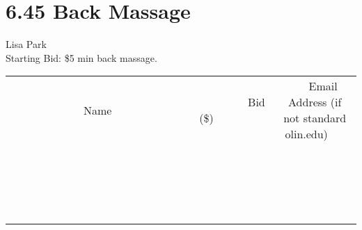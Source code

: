 \documentclass[11pt]{article}
\begin{document}
\section*{6.45 Back Massage}
Lisa Park
\\
Starting Bid: \$5
 min back massage.
\\[3ex]
\begin{tabular}{c c c}
~~~~~~~~~~~~~Name~~~~~~~~~~~~~ & ~~~~~~~~~Bid (\$)~~~~~~~~~  & ~~~Email Address (if not standard olin.edu)~~~\\
 & & \\
\hline
 & & \\
\hline
 & & \\
\hline
 & & \\
\hline
 & & \\
\hline
 & & \\
\hline
 & & \\
\hline
 & & \\
\hline
 & & \\
\hline
 & & \\
\hline
 & & \\
\hline
 & & \\
\hline
 & & \\
\hline
 & & \\
\hline
 & & \\
\hline
 & & \\
\hline
 & & \\
\hline
 & & \\
\hline
 & & \\
\hline
\end{tabular}
\newpage
\end{document}

